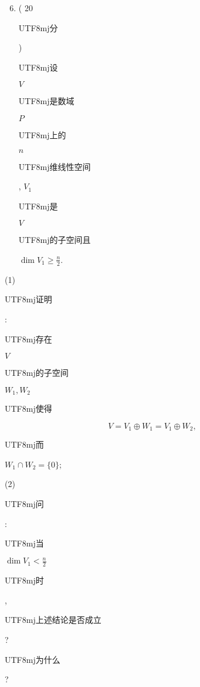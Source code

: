 \documentclass[10pt]{article}
\begin{document}
\begin{enumerate}
  \setcounter{enumi}{5}
  \item ( 20 \begin{CJK}{UTF8}{mj}分\end{CJK}) \begin{CJK}{UTF8}{mj}设\end{CJK} $V$ \begin{CJK}{UTF8}{mj}是数域\end{CJK} $P$ \begin{CJK}{UTF8}{mj}上的\end{CJK} $n$ \begin{CJK}{UTF8}{mj}维线性空间\end{CJK}, $V_{1}$ \begin{CJK}{UTF8}{mj}是\end{CJK} $V$ \begin{CJK}{UTF8}{mj}的子空间且\end{CJK} $\operatorname{dim} V_{1} \geq \frac{n}{2}$.
\end{enumerate}
(1) \begin{CJK}{UTF8}{mj}证明\end{CJK}: \begin{CJK}{UTF8}{mj}存在\end{CJK} $V$ \begin{CJK}{UTF8}{mj}的子空间\end{CJK} $W_{1}, W_{2}$ \begin{CJK}{UTF8}{mj}使得\end{CJK}
$$
V=V_{1} \oplus W_{1}=V_{1} \oplus W_{2},
$$
\begin{CJK}{UTF8}{mj}而\end{CJK} $W_{1} \cap W_{2}=\{0\}$;

(2) \begin{CJK}{UTF8}{mj}问\end{CJK}: \begin{CJK}{UTF8}{mj}当\end{CJK} $\operatorname{dim} V_{1}<\frac{n}{2}$ \begin{CJK}{UTF8}{mj}时\end{CJK}, \begin{CJK}{UTF8}{mj}上述结论是否成立\end{CJK}? \begin{CJK}{UTF8}{mj}为什么\end{CJK}?
\end{document}
